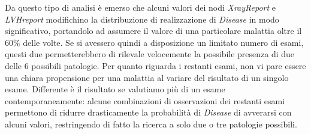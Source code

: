Da questo tipo di analisi è emerso che alcuni valori dei nodi \textit{XrayReport} e \textit{LVHreport} modifichino la distribuzione di realizzazione di \textit{Disease} in modo significativo, portandolo ad assumere il valore di una particolare malattia oltre il $60\%$ delle volte. Se si avessero quindi a disposizione un limitato numero di esami, questi due permetterebbero di rilevale velocemente la possibile presenza di due delle 6 possibili patologie. Per quanto riguarda i restanti esami, non vi pare essere una chiara propensione per una malattia al variare del risultato di un singolo esame. Differente è il risultato se valutiamo più di un esame contemporaneamente: alcune combinazioni di osservazioni dei restanti esami permettono di ridurre drasticamente la probabilità di \textit{Disease} di avverarsi con alcuni valori, restringendo di fatto la ricerca a solo due o tre patologie possibili. 